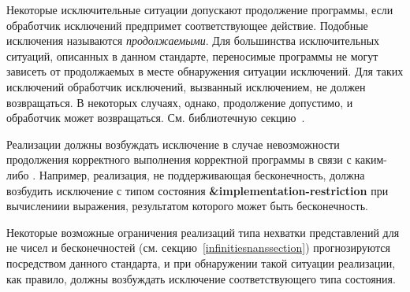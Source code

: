 Некоторые исключительные ситуации допускают продолжение программы, если обработчик исключений
предпримет соответствующее действие. Подобные исключения называются
\textit{продолжаемыми}. Для большинства исключительных ситуаций,
описанных в данном стандарте, переносимые программы не могут зависеть от продолжаемых в месте
обнаружения ситуации исключений. Для таких исключений обработчик исключений, вызванный
исключением, не должен возвращаться. В некоторых случаях, однако, продолжение допустимо, и
обработчик может возвращаться. См. библиотечную
секцию~.

Реализации должны возбуждать исключение в случае невозможности продолжения корректного выполнения
корректной программы в связи с каким-либо . Например, реализация,
не поддерживающая бесконечность, должна возбудить исключение с типом состояния
{\cf\bfseries\&implementation-restriction} при вычислениии выражения, результатом которого
может быть бесконечность.

Некоторые возможные ограничения реализаций типа нехватки представлений для не чисел и
бесконечностей (см. секцию~\ref{infinitiesnanssection}) прогнозируются посредством данного
стандарта, и при обнаружении такой ситуации реализации, как правило, должны возбуждать исключение
соответствующего типа состояния.

